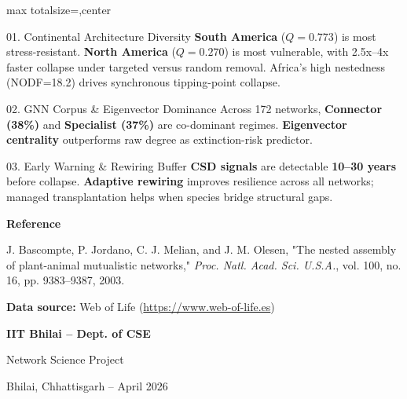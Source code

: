 \documentclass[10pt]{article}
\begin{document}
\begin{adjustbox}{max totalsize={\textwidth}{\textheight},center}
\begin{minipage}{\textwidth}
\begin{tcolorbox}[colback=panel2,colframe=gold,boxrule=0.8pt,arc=2mm,title=\textbf{Key Findings \& Conclusions},colbacktitle=white,coltitle=forest]
\begin{minipage}[t]{0.32\textwidth}
\begin{finding}{01. Continental Architecture Diversity}
\textbf{South America} ($Q=0.773$) is most stress-resistant. \textbf{North America} ($Q=0.270$) is most vulnerable, with 2.5x--4x faster collapse under targeted versus random removal. Africa's high nestedness (NODF=18.2) drives synchronous tipping-point collapse.
\end{finding}
\end{minipage}\hfill
\begin{minipage}[t]{0.32\textwidth}
\begin{finding}{02. GNN Corpus \& Eigenvector Dominance}
Across 172 networks, \textbf{Connector (38\%)} and \textbf{Specialist (37\%)} are co-dominant regimes. \textbf{Eigenvector centrality} outperforms raw degree as extinction-risk predictor.
\end{finding}
\end{minipage}\hfill
\begin{minipage}[t]{0.32\textwidth}
\begin{finding}{03. Early Warning \& Rewiring Buffer}
\textbf{CSD signals} are detectable \textbf{10--30 years} before collapse. \textbf{Adaptive rewiring} improves resilience across all networks; managed transplantation helps when species bridge structural gaps.
\end{finding}
\end{minipage}
\end{tcolorbox}

\vspace{1.0mm}

\begin{tcolorbox}[colback=white,colframe=gold,boxrule=0.8pt,arc=2mm]
\begin{minipage}[t]{0.73\textwidth}
\textbf{Reference}\par
J. Bascompte, P. Jordano, C. J. Melian, and J. M. Olesen, "The nested assembly of plant-animal mutualistic networks," \emph{Proc. Natl. Acad. Sci. U.S.A.}, vol. 100, no. 16, pp. 9383--9387, 2003.\par
\textbf{Data source:} Web of Life (\url{https://www.web-of-life.es})
\end{minipage}\hfill
\begin{minipage}[t]{0.24\textwidth}
\RaggedLeft
\textbf{IIT Bhilai -- Dept. of CSE}\par
Network Science Project\par
Bhilai, Chhattisgarh -- April 2026
\end{minipage}
\end{tcolorbox}

\end{minipage}
\end{adjustbox}
\end{document}
